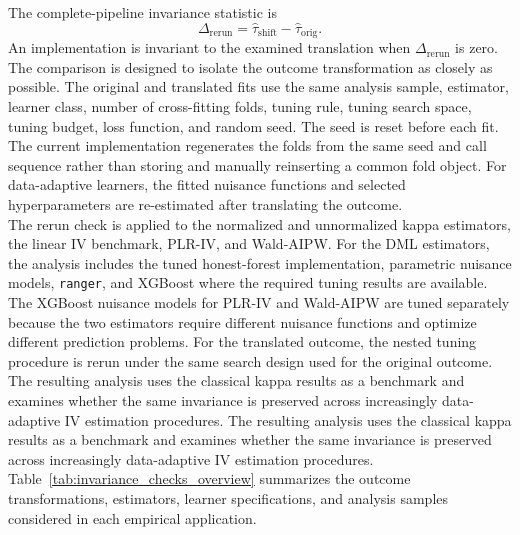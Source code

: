 \documentclass[12pt, a4paper, oneside]{article}
\theoremstyle{plain}
\theoremstyle{definition}
\begin{document}
The complete-pipeline invariance statistic is
\begin{equation}
    \Delta_{\mathrm{rerun}}
    =
    \widehat{\tau}_{\mathrm{shift}}
    -
    \widehat{\tau}_{\mathrm{orig}}.
    \label{eq:complete_pipeline_rerun}
\end{equation}
An implementation is invariant to the examined translation when
\(\Delta_{\mathrm{rerun}}\) is zero.\\
The comparison is designed to isolate the outcome transformation as closely as
possible. The original and translated fits use the same analysis sample, estimator,
learner class, number of cross-fitting folds, tuning rule, tuning search space, tuning
budget, loss function, and random seed. The seed is reset before each fit. The current
implementation regenerates the folds from the same seed and call sequence rather than
storing and manually reinserting a common fold object. 
For data-adaptive learners, the fitted nuisance functions and selected hyperparameters
are re-estimated after translating the outcome. \\
The rerun check is applied to the normalized and unnormalized kappa estimators, the
linear IV benchmark, PLR-IV, and Wald-AIPW. For the DML estimators, the analysis
includes the tuned honest-forest implementation, parametric nuisance models,
\texttt{ranger}, and XGBoost where the required tuning results are available. The
XGBoost nuisance models for PLR-IV and Wald-AIPW are tuned separately because the
two estimators require different nuisance functions and optimize different prediction
problems. For the translated outcome, the nested tuning procedure is rerun under the
same search design used for the original outcome.\\
The resulting analysis  uses the
classical kappa results as a benchmark and examines whether the same invariance is
preserved across increasingly data-adaptive IV estimation procedures.
The resulting analysis uses the classical kappa results as a benchmark and examines whether the same invariance is preserved across increasingly data-adaptive IV estimation procedures. Table~\ref{tab:invariance_checks_overview} summarizes the outcome transformations, estimators, learner specifications, and analysis samples considered in each empirical application.
\end{document}
